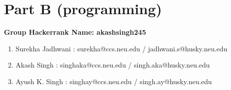 \documentclass[12pt]{article}
\begin{document}
\section{Part B (programming)}
\textbf{\large{Group Hackerrank Name: akashsingh245 }}
\begin{enumerate}
	\item Surekha Jadhwani : surekha@ccs.neu.edu / jadhwani.s@husky.neu.edu
	\item Akash Singh : singhaka@ccs.neu.edu / singh.aka@husky.neu.edu
	\item Ayush K. Singh : singhay@ccs.neu.edu / singh.ay@husky.neu.edu
\end{enumerate}
\end{document}
